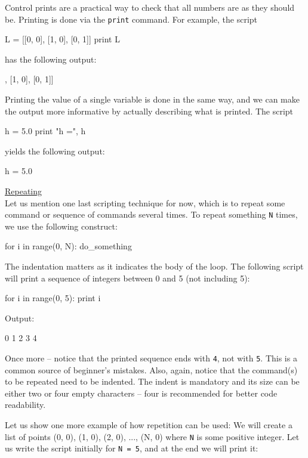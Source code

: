 \noindent
Control prints are a practical way to check that all numbers are as they should be.
Printing is done via the {\tt print} command. For example, the script

\begin{bluecode}
L = [[0, 0], [1, 0], [0, 1]]
print L
\end{bluecode} 
has the following output:

\begin{bluecode}
[[0, 0], [1, 0], [0, 1]]
\end{bluecode} 
Printing the value of a single variable is done in the same way, and we can 
make the output more informative by actually describing what is printed.
The script

\begin{bluecode}
h = 5.0
print "h =", h
\end{bluecode} 
yields the following output:

\begin{bluecode}
h = 5.0
\end{bluecode} 
\vspace{4mm}
\underline{Repeating}\\

\noindent
Let us mention one last scripting technique for now, which is to repeat 
some command or sequence of commands several times. To repeat something 
{\tt N} times, we use the following construct: 

\begin{bluecode}
for i in range(0, N):
    do_something
\end{bluecode}
The indentation matters as it indicates the body of the loop.
The following script will print a sequence of integers between 
0 and 5 (not including 5):

\begin{bluecode}
for i in range(0, 5):
    print i
\end{bluecode}
Output:

\begin{bluecode}
0
1
2
3
4
\end{bluecode}
Once more -- notice that the printed sequence ends with {\tt 4}, not with {\tt 5}.
This is a common source of beginner's mistakes.
Also, again, notice that the command(s) to be repeated need to be indented. The indent is mandatory and 
its size can be either two or four empty characters -- four is recommended for better
code readability.

Let us show one more example of how repetition can be used: We will create a list of 
points (0, 0), (1, 0), (2, 0), ..., (N, 0) where {\tt N} is some positive integer. Let us
write the script initially for {\tt N = 5}, and at the end we will print it:

